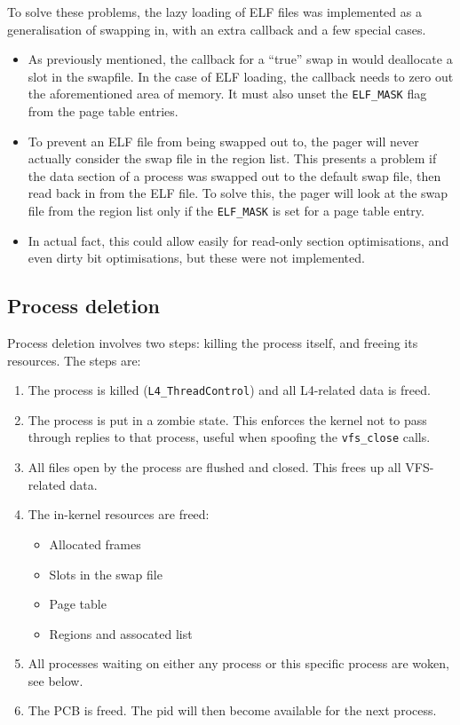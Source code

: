 \documentclass[12pt,english]{article}
\begin{document}
To solve these problems, the lazy loading of ELF files was implemented as a generalisation of swapping in, with an extra callback and a few special cases.
\begin{itemize}
\item As previously mentioned, the callback for a ``true'' swap in would deallocate a slot in the swapfile.  In the case of ELF loading, the callback needs to zero out the aforementioned area of memory.  It must also unset the \texttt{ELF\_MASK} flag from the page table entries.
\item To prevent an ELF file from being swapped out to, the pager will never actually consider the swap file in the region list.  This presents a problem if the data section of a process was swapped out to the default swap file, then read back in from the ELF file.  To solve this, the pager will look at the swap file from the region list only if the \texttt{ELF\_MASK} is set for a page table entry.
\item In actual fact, this could allow easily for read-only section optimisations, and even dirty bit optimisations, but these were not implemented.
\end{itemize}

\subsection{Process deletion} \label{sub:process_delete}

Process deletion involves two steps: killing the process itself, and freeing its resources.  The steps are:

\begin{enumerate}
\item The process is killed (\texttt{L4\_ThreadControl}) and all L4-related data is freed.
\item The process is put in a zombie state.  This enforces the kernel not to pass through replies to that process, useful when spoofing the \texttt{vfs\_close} calls.
\item All files open by the process are flushed and closed.  This frees up all VFS-related data.
\item The in-kernel resources are freed:
\begin{itemize}
\item Allocated frames
\item Slots in the swap file
\item Page table
\item Regions and assocated list
\end{itemize}
\item All processes waiting on either any process or this specific process are woken, see below.  
\item The PCB is freed.  The pid will then become available for the next process.
\end{enumerate}
\end{document}
